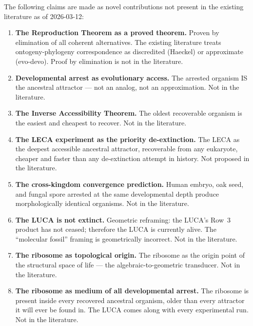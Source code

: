 \documentclass[12pt, a4paper]{article}
\theoremstyle{definition}
\theoremstyle{remark}
\begin{document}
The following claims are made as novel contributions not
present in the existing literature as of 2026-03-12:

\begin{enumerate}[label=\textbf{N\arabic*.}]
  \item \textbf{The Reproduction Theorem as a proved theorem.}
    Proven by elimination of all coherent alternatives. The
    existing literature treats ontogeny-phylogeny
    correspondence as discredited (Haeckel) or approximate
    (evo-devo). Proof by elimination is not in the literature.

  \item \textbf{Developmental arrest as evolutionary access.}
    The arrested organism IS the ancestral attractor --- not
    an analog, not an approximation. Not in the literature.

  \item \textbf{The Inverse Accessibility Theorem.}
    The oldest recoverable organism is the easiest and
    cheapest to recover. Not in the literature.

  \item \textbf{The LECA experiment as the priority
    de-extinction.} The LECA as the deepest accessible
    ancestral attractor, recoverable from any eukaryote,
    cheaper and faster than any de-extinction attempt in
    history. Not proposed in the literature.

  \item \textbf{The cross-kingdom convergence prediction.}
    Human embryo, oak seed, and fungal spore arrested at the
    same developmental depth produce morphologically
    identical organisms. Not in the literature.

  \item \textbf{The LUCA is not extinct.} Geometric
    reframing: the LUCA's Row~3 product has not ceased;
    therefore the LUCA is currently alive. The ``molecular
    fossil'' framing is geometrically incorrect. Not in the
    literature.

  \item \textbf{The ribosome as topological origin.}
    The ribosome as the origin point of the structural space
    of life --- the algebraic-to-geometric transducer. Not
    in the literature.

  \item \textbf{The ribosome as medium of all developmental
    arrest.} The ribosome is present inside every recovered
    ancestral organism, older than every attractor it will
    ever be found in. The LUCA comes along with every
    experimental run. Not in the literature.
\end{enumerate}
\end{document}
